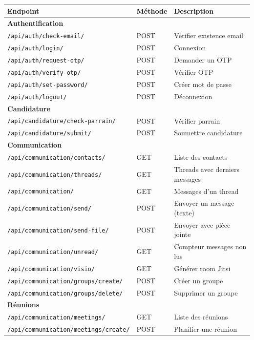 \documentclass[12pt,a4paper]{article}
\begin{document}
\begin{longtable}{p{6cm}p{2cm}p{5cm}}
\toprule
\textbf{Endpoint} & \textbf{Méthode} & \textbf{Description} \\
\midrule
\endhead
\multicolumn{3}{l}{\textbf{\color{sebcblue}Authentification}} \\
\texttt{/api/auth/check-email/} & POST & Vérifier existence email \\
\texttt{/api/auth/login/} & POST & Connexion \\
\texttt{/api/auth/request-otp/} & POST & Demander un OTP \\
\texttt{/api/auth/verify-otp/} & POST & Vérifier OTP \\
\texttt{/api/auth/set-password/} & POST & Créer mot de passe \\
\texttt{/api/auth/logout/} & POST & Déconnexion \\
\midrule
\multicolumn{3}{l}{\textbf{\color{sebcblue}Candidature}} \\
\texttt{/api/candidature/check-parrain/} & POST & Vérifier parrain \\
\texttt{/api/candidature/submit/} & POST & Soumettre candidature \\
\midrule
\multicolumn{3}{l}{\textbf{\color{sebcblue}Communication}} \\
\texttt{/api/communication/contacts/} & GET & Liste des contacts \\
\texttt{/api/communication/threads/} & GET & Threads avec derniers messages \\
\texttt{/api/communication/} & GET & Messages d'un thread \\
\texttt{/api/communication/send/} & POST & Envoyer un message (texte) \\
\texttt{/api/communication/send-file/} & POST & Envoyer avec pièce jointe \\
\texttt{/api/communication/unread/} & GET & Compteur messages non lus \\
\texttt{/api/communication/visio/} & GET & Générer room Jitsi \\
\texttt{/api/communication/groups/create/} & POST & Créer un groupe \\
\texttt{/api/communication/groups/delete/} & POST & Supprimer un groupe \\
\midrule
\multicolumn{3}{l}{\textbf{\color{sebcblue}Réunions}} \\
\texttt{/api/communication/meetings/} & GET & Liste des réunions \\
\texttt{/api/communication/meetings/create/} & POST & Planifier une réunion \\

\end{longtable}
\end{document}
